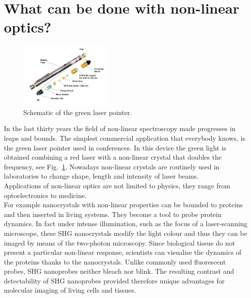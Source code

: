 \section{What can be done with non-linear optics?} 
\begin{figure}
    \vspace{-0.7cm}
  \begin{center}
    \includegraphics[width=0.4\textwidth]{Figures/lasergreen}
  \end{center}
  \caption{Schematic of the green laser pointer. \label{greenlaser}}
\end{figure}
In the last thirty years the field of non-linear spectroscopy\cite{bloembergen1982nonlinear} made progresses in leaps and bounds. The simplest commercial application that everybody knows, is the green laser pointer used in conferences. In this device the green light is obtained combining a red laser with a non-linear crystal that doubles the frequency, see Fig.~\ref{greenlaser}. Nowadays non-linear crystals are routinely used in laboratories to change shape, length and intensity of laser beams. \\
        Applications of non-linear optics are not limited to physics, they range from optoelectronics to medicine. \\
        For example nanocrystals with non-linear properties can be bounded to proteins and then inserted in living systems.
        They become a tool to probe protein dynamics. In fact under intense illumination, such as the focus of a laser-scanning microscope, these SHG nanocrystals modify the light colour and thus they can be imaged by means of the two-photon microscopy. Since biological tissue do not present a particular non-linear response, scientists can visualise the dynamics of the proteins thanks to the nanocrystals.        
        Unlike commonly used fluorescent probes, SHG nanoprobes neither bleach nor blink. The resulting contrast and detectability of SHG nanoprobes provided therefore unique advantages for molecular imaging of living cells and tissues. \cite{pantazis2010second}

